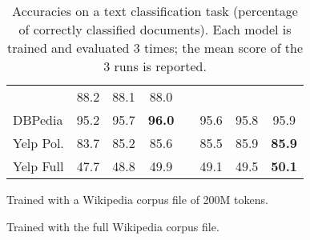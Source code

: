 \begin{table}[!t]
\begin{subtable}{\textwidth}
{\begin{tabular}{@{}lccccccc@{}}
                      & 88.2 & 88.1 & 88.0\\
            DBPedia   & 95.2 & 95.7 & \bf{96.0} &
                      & 95.6 & 95.8 & 95.9\\
            Yelp Pol. & 83.7 & 85.2 & 85.6 &
                      & 85.5 & 85.9 & \bf{85.9}\\
            Yelp Full & 47.7 & 48.8 & 49.9 &
                      & 49.1 & 49.5 &\bf{50.1}\\
          \bottomrule[0.1em]
        \end{tabular}}
        \caption{Trained with a Wikipedia corpus file of 200M tokens.}
        \vspace*{1em}
      \end{subtable}
      \begin{subtable}{\textwidth}
        \centering
        \caption{Trained with the full Wikipedia corpus file.}
      \end{subtable}
      \caption[Evaluation of \texttt{dict2vec} and other models on a text
      classification task.]{Accuracies on a text classification task (percentage
      of correctly classified documents). Each model is trained and evaluated 3
      times; the mean score of the 3 runs is reported.}
      \label{ch05:tab:results-classification}
    \end{table}

